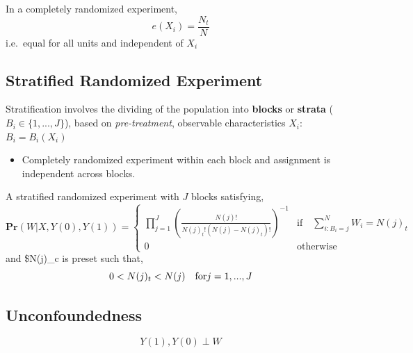 \documentclass[
  letterpaper,
  DIV=11,
  numbers=noendperiod]{scrreprt}
\providecommand{\tightlist}{%
  \setlength{\itemsep}{0pt}\setlength{\parskip}{0pt}}\usepackage{longtable,booktabs,array}
\theoremstyle{definition}
\theoremstyle{remark}
\begin{document}
In a completely randomized experiment, \[
e(X_i)=\frac{N_t}{N}
\] i.e.~equal for all units and independent of \(X_i\)

\hypertarget{stratified-randomized-experiment}{%
\subsection{Stratified Randomized
Experiment}\label{stratified-randomized-experiment}}

Stratification involves the dividing of the population into
\textbf{blocks} or \textbf{strata} (\(B_i \in \{1,...,J\}\)), based on
\emph{pre-treatment}, observable characteristics \(X_i\):
\(B_i = B_i(X_i)\)

\par

\begin{itemize}
\tightlist
\item
  Completely randomized experiment within each block and assignment is
  independent across blocks.
\end{itemize}

\begin{tcolorbox}[enhanced jigsaw, breakable, colframe=quarto-callout-note-color-frame, toptitle=1mm, toprule=.15mm, opacitybacktitle=0.6, opacityback=0, rightrule=.15mm, titlerule=0mm, colback=white, bottomtitle=1mm, title={Def. Stratified Randomized Experiment}, arc=.35mm, coltitle=black, colbacktitle=quarto-callout-note-color!10!white, leftrule=.75mm, bottomrule=.15mm, left=2mm]

A stratified randomized experiment with \(J\) blocks satisfying, \[
\mathbf{Pr}(W|X,Y(0),Y(1))=
\begin{cases}
\prod^J_{j=1} (\frac{N(j)!}{N(j)_t!(N(j)-N(j)_t)!})^{-1} & \text{if} \quad \sum^N_{i:B_i=j} W_i=N(j)_t \\
                    0 &\text{otherwise}
\end{cases}
\] and \$N(j)\_c is preset such that, \[
0 < N(j)_t <N(j) \quad \text{for} \space j = 1,...,J
\]

\end{tcolorbox}

\hypertarget{unconfoundedness-1}{%
\subsection{Unconfoundedness}\label{unconfoundedness-1}}

\begin{tcolorbox}[enhanced jigsaw, breakable, colframe=quarto-callout-note-color-frame, toptitle=1mm, toprule=.15mm, opacitybacktitle=0.6, opacityback=0, rightrule=.15mm, titlerule=0mm, colback=white, bottomtitle=1mm, title={Def. Independent Assignment}, arc=.35mm, coltitle=black, colbacktitle=quarto-callout-note-color!10!white, leftrule=.75mm, bottomrule=.15mm, left=2mm]

\[Y(1),Y(0)\perp W\]

\end{tcolorbox}
\end{document}
